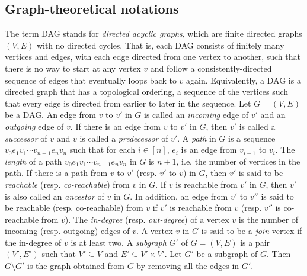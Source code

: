 \subsection*{Graph-theoretical notations}
The term DAG stands for \emph{directed acyclic graphs}, which are finite directed graphs $(V, E)$ with no directed cycles. That is, each DAG consists of finitely many vertices and edges, with each edge directed from one vertex to another, such that there is no way to start at any vertex $v$ and follow a consistently-directed sequence of edges that eventually loops back to $v$ again. Equivalently, a DAG is a directed graph that has a topological ordering, a sequence of the vertices such that every edge is directed from earlier to later in the sequence. Let $G=(V,E)$ be a DAG. An edge from $v$ to $v'$ in $G$ is called an \emph{incoming} edge of $v'$ and an \emph{outgoing} edge of $v$. If there is an edge from $v$ to $v'$ in $G$, then $v'$ is called a \emph{successor} of $v$ and $v$ is called a \emph{predecessor} of $v'$. A \emph{path} in $G$ is a sequence $v_0 e_1 v_1 \cdots v_{n-1} e_n v_n$ such that for each $i \in [n]$, $e_i$ is an edge from $v_{i-1}$ to $v_i$. The \emph{length} of a path $v_0 e_1 v_1 \cdots v_{n-1} e_n v_n$ in $G$ is $n+1$, i.e. the number of vertices in the path. If there is a path from $v$ to $v'$ (resp. $v'$ to $v$) in $G$, then $v'$ is said to be \emph{reachable} (resp. \emph{co-reachable}) from $v$ in $G$. If $v$ is reachable from $v'$ in $G$, then $v'$ is also called an \emph{ancestor} of $v$ in $G$. In addition, an edge from $v'$ to $v''$ is said to be reachable (resp. co-reachable) from $v$ if $v'$ is reachable from $v$ (resp. $v''$ is co-reachable from $v$). The \emph{in-degree} (resp. \emph{out-degree}) of a vertex $v$ is the number of incoming (resp. outgoing) edges of $v$. A vertex $v$ in $G$ is said to be a \emph{join} vertex if the in-degree of $v$ is at least two. 
A \emph{subgraph} $G'$ of $G=(V,E)$ is a pair $(V', E')$ such that $V' \subseteq V$ and $E' \subseteq V' \times V'$. Let $G'$ be a subgraph of $G$. Then $G \setminus G'$ is the graph obtained from $G$ by removing all the edges in $G'$. 


